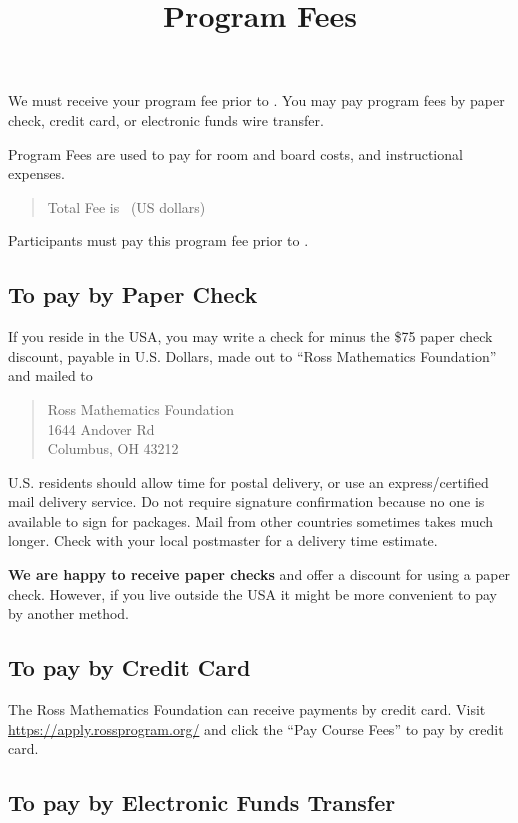 \documentclass[11pt]{ross}
\title{Program Fees}
\begin{document}
\maketitle

We must receive your program fee prior to \feeduedate.  You may pay
program fees by paper check, credit card, or electronic funds wire
transfer.

Program Fees are used to pay for room and board costs, and instructional expenses.
\begin{quote}
Total Fee is \totalfee \ (US dollars)
\end{quote}  

Participants must pay this program fee prior to \feeduedate.

\subsection*{To pay by Paper Check}

If you reside in the USA, you may write a check for \totalfee minus
the \$75 paper check discount, payable in U.S. Dollars, made out to
``Ross Mathematics Foundation'' and mailed to
\begin{quote}
Ross Mathematics Foundation  \\
1644 Andover Rd \\
Columbus, OH 43212
\end{quote} U.S. residents should allow time for postal delivery, or
use an express/certified mail delivery service. Do not require
signature confirmation because no one is available to sign for
packages.  Mail from other countries sometimes takes much longer.
Check with your local postmaster for a delivery time estimate.

\textbf{We are happy to receive paper checks} and offer a discount for
using a paper check.  However, if you live outside the USA it might be
more convenient to pay by another method.

\subsection*{To pay by Credit Card}

The Ross Mathematics Foundation can receive payments by credit card.
Visit \url{https://apply.rossprogram.org/} and click the ``Pay Course
Fees'' to pay by credit card.

\subsection*{To pay by Electronic Funds Transfer}
\end{document}

